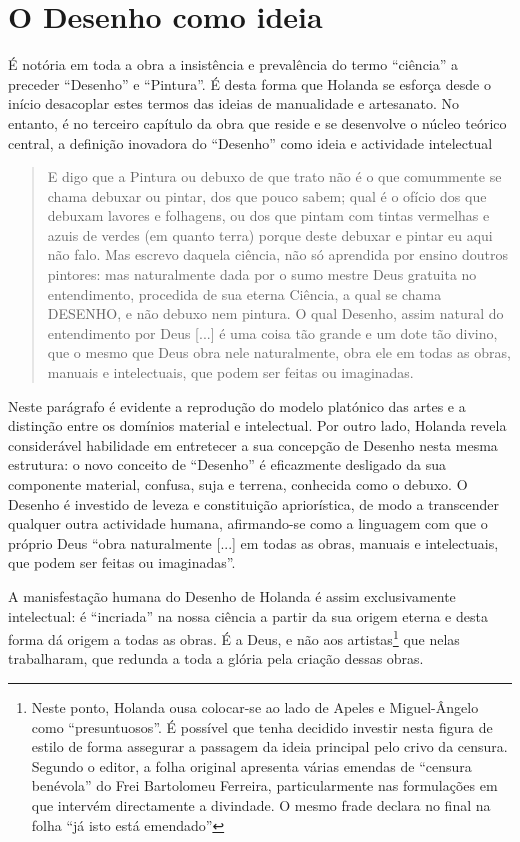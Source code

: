 \documentclass{article}
\begin{document}
\section{O Desenho como ideia}

É notória em toda a obra a insistência e prevalência do termo
``ciência'' a preceder ``Desenho'' e ``Pintura''. É desta forma que
Holanda se esforça desde o início desacoplar estes termos das ideias
de manualidade e artesanato. No entanto, é no terceiro capítulo da
obra que reside e se desenvolve o núcleo teórico central, a definição
inovadora do ``Desenho'' como ideia e actividade intelectual
\cite[fl.36v]{holanda}

\begin{quote}
  E digo que a Pintura ou debuxo de que trato não é o que comummente
  se chama debuxar ou pintar, dos que pouco sabem; qual é o ofício dos
  que debuxam lavores e folhagens, ou dos que pintam com tintas
  vermelhas e azuis de verdes (em quanto terra) porque deste debuxar e
  pintar eu aqui não falo. Mas escrevo daquela ciência, não só
  aprendida por ensino doutros pintores: mas naturalmente dada por o
  sumo mestre Deus gratuita no entendimento, procedida de sua eterna
  Ciência, a qual se chama DESENHO, e não debuxo nem pintura. O qual
  Desenho, assim natural do entendimento por Deus [...] é uma coisa
  tão grande e um dote tão divino, que o mesmo que Deus obra nele
  naturalmente, obra ele em todas as obras, manuais e intelectuais,
  que podem ser feitas ou imaginadas.
\end{quote}

Neste parágrafo é evidente a reprodução do modelo platónico das artes
e a distinção entre os domínios material e intelectual. Por outro
lado, Holanda revela considerável habilidade em entretecer a sua
concepção de Desenho nesta mesma estrutura: o novo conceito de
``Desenho'' é eficazmente desligado da sua componente material,
confusa, suja e terrena, conhecida como o debuxo. O Desenho é
investido de leveza e constituição apriorística, de modo a transcender
qualquer outra actividade humana, afirmando-se como a linguagem com
que o próprio Deus ``obra naturalmente [...] em todas as obras,
manuais e intelectuais, que podem ser feitas ou
imaginadas''.\cite[fl.36v]{holanda}

A manisfestação humana do Desenho de Holanda é assim exclusivamente
intelectual: é ``incriada'' na nossa ciência a partir da sua origem
eterna e desta forma dá origem a todas as obras. É a Deus, e não aos
artistas\footnote{Neste ponto, Holanda ousa colocar-se ao lado de
  Apeles e Miguel-Ângelo como ``presuntuosos''. É possível que tenha
  decidido investir nesta figura de estilo de forma assegurar a
  passagem da ideia principal pelo crivo da censura. Segundo o editor,
  a folha original apresenta várias emendas de ``censura benévola'' do
  Frei Bartolomeu Ferreira, particularmente nas formulações em que
  intervém directamente a divindade. O mesmo frade declara no final na
  folha ``já isto está emendado''} que nelas trabalharam, que redunda
a toda a glória pela criação dessas obras.
\end{document}
